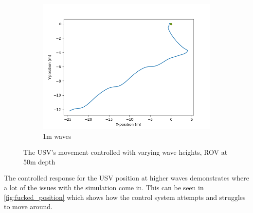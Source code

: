 \documentclass[class=article, crop=false]{standalone}
\begin{document}
\begin{figure}
\begin{subfigure}{0.8\textwidth}
        \includegraphics{scenario1/rov-50m/1.0m/usv_position_controlled}
        \caption{1m waves}
        \label{fig:position_controlled_1m}
    \end{subfigure}
    \vfill
    \caption{The USV's movement controlled with varying wave heights, ROV at 50m depth}
    \label{fig:position-controlled}
\end{figure}

The controlled response for the USV position at higher waves demonstrates where a lot of the issues with the simulation come in. This can be seen in \cref{fig:fucked_position} which shows how the control system attempts and struggles to move around.
\end{document}
